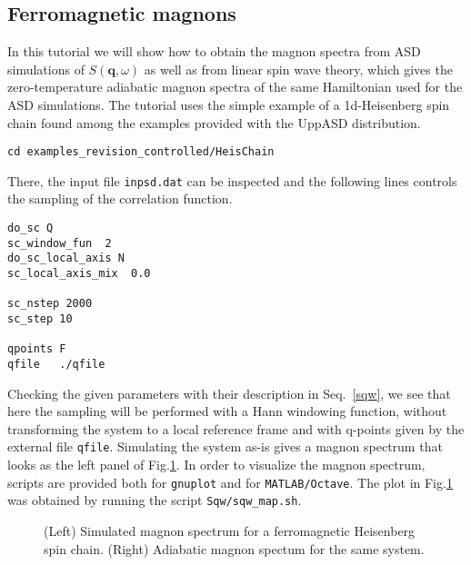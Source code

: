\documentclass[11pt,fleqn,a4]{book} %
\begin{document}
\subsection{Ferromagnetic magnons}
In this tutorial we will show how to obtain the magnon spectra from ASD simulations of $S(\mathbf{q},\omega)$ as well as from linear spin wave theory, which gives the zero-temperature adiabatic magnon spectra of the same Hamiltonian used for the ASD simulations. The tutorial uses the simple example of a 1d-Heisenberg spin chain found among the examples provided with the UppASD distribution. 
\begin{fBox} 
\begin{Verbatim}
cd examples_revision_controlled/HeisChain
\end{Verbatim}
\end{fBox}
There, the input file \texttt{inpsd.dat} can be inspected and the following lines controls the sampling of the correlation function.
\begin{fBox} 
\begin{Verbatim}
do_sc Q                     
sc_window_fun  2          
do_sc_local_axis N      
sc_local_axis_mix  0.0  

sc_nstep 2000     
sc_step 10        

qpoints F         
qfile   ./qfile
\end{Verbatim}
\end{fBox}
Checking the given parameters with their description in Seq.~\ref{sqw}, we see that here the sampling will be performed with a Hann windowing function, without transforming the system to a local reference frame and with q-points given by the external file \texttt{qfile}. Simulating the system as-is gives a magnon spectrum that looks as the left panel of Fig.\ref{fig:sqw_heischainfm}. In order to visualize the magnon spectrum, scripts are provided both for \texttt{gnuplot} and for \texttt{MATLAB/Octave}. The plot in Fig.\ref{fig:sqw_heischainfm} was obtained by running the script \texttt{Sqw/sqw_map.sh}.
\begin{figure}[h!]
\caption{(Left) Simulated magnon spectrum for a ferromagnetic Heisenberg spin chain.
(Right) Adiabatic magnon spectum for the same system.}
\label{fig:sqw_heischainfm}
\end{figure}
\end{document}
